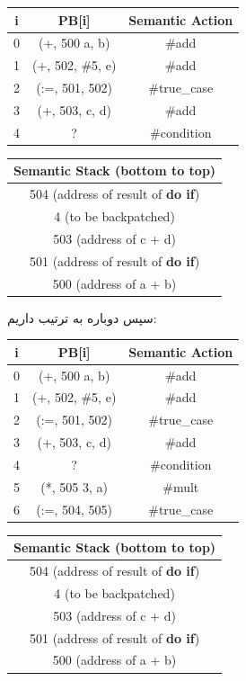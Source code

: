 \documentclass[]{article}
\begin{document}
\begin{latin}
\centering
\begin{tabular}{|c|c|c|}
    \hline
    i & PB[i] & Semantic Action\\
    \hline
    0 & (+, 500 a, b) & \#add\\
    1 & (+, 502, \#5, e) & \#add\\
    2 & (:=, 501, 502) & \#true\_case\\
    3 & (+, 503, c, d) & \#add\\
    4 & ? & \#condition\\
    \hline
\end{tabular}
\begin{tabular}{|c|}
    \hline
    Semantic Stack (bottom to top)\\
    \hline
    504 (address of result of \textbf{do if})\\
    \hline
    4 (to be backpatched)\\
    \hline
    503 (address of c + d)\\
    \hline
    501 (address of result of \textbf{do if})\\
    \hline
    500 (address of a + b)\\
    \hline
\end{tabular}
\end{latin}
سپس دوباره به ترتیب داریم:
\begin{latin}
\centering
\begin{tabular}{|c|c|c|}
    \hline
    i & PB[i] & Semantic Action\\
    \hline
    0 & (+, 500 a, b) & \#add\\
    1 & (+, 502, \#5, e) & \#add\\
    2 & (:=, 501, 502) & \#true\_case\\
    3 & (+, 503, c, d) & \#add\\
    4 & ? & \#condition\\
    5 & (*, 505 3, a) & \#mult\\
    6 & (:=, 504, 505) & \#true\_case\\
    \hline
\end{tabular}
\begin{tabular}{|c|}
    \hline
    Semantic Stack (bottom to top)\\
    \hline
    504 (address of result of \textbf{do if})\\
    \hline
    4 (to be backpatched)\\
    \hline
    503 (address of c + d)\\
    \hline
    501 (address of result of \textbf{do if})\\
    \hline
    500 (address of a + b)\\
    \hline
\end{tabular}
\end{latin}
\end{document}
